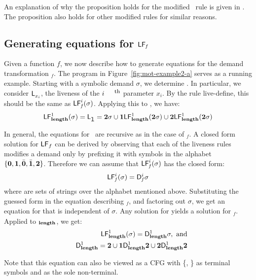 \documentclass[9pt]{sigplanconf}
\begin{document}
An  explanation of  why the  proposition holds  for the
modified  \CONS\ rule  is  given in  \cite{asati14lgc}.
The proposition also holds for other modified rules for
similar reasons.


\subsection{Generating equations for $\mathsf{LF}_{\mathit f}$}
Given a  function $\mathit{f}$, we now  describe how to
generate  equations   for  the   demand  transformation
\Lfonly$_\mathit{f}$.        The       program       in
Figure~\ref{fig:mot-example2-a}   serves  as   a  running
example.  Starting with a  symbolic demand $\sigma$, we
determine  .   In
particular, we  consider $\mathsf{L}_{{x_i}}^{}$,  the liveness
of the $i^{\mbox{\footnotesize th}}$ parameter $x_i$.   By   the   rule   {\sc
  live-define},   this   should    be   the   same   as
$\mathsf{LF}_{\mathit f}^{i}( {\mathit \sigma})$. Applying this to \length, we have:
$$
 \mathsf{LF}_{\mathit {\mathbf{length}}}^{1}( {\mathit \sigma}) = \mathsf{L}_{{\mbox{\tt l}}}^{} = {\mathbf{2}}\sigma \cup \mathbf{1}\mathsf{LF}_{\mathit {\mathbf{length}}}^{1}( {\mathit {{\mathbf{2}}}\sigma})
  \cup {\mathbf{2}}\mathsf{LF}_{\mathit {\mathbf{length}}}^{1}( {\mathit {{\mathbf{2}}}\sigma})
$$

In general, the equations for \Lfonly\ are recursive as in the case of
\Lfonly$_\mathit{f}$. A closed  form solution for $\mathsf{LF}_{\mathit \mathit{f}}$
can be derived by observing that each of the liveness rules modifies a
demand  only by  prefixing it  with symbols  in the  alphabet $\lbrace
\mathbf{0}, \mathbf{1},\bar{\mathbf{0}},  \bar{\mathbf{1}}, {\mathbf{2}}  \rbrace$. Therefore we  can assume
that $\mathsf{LF}_{\mathit f}^{i}( {\mathit \sigma})$ has the closed form:
\begin{eqnarray}
\label{eq:LF:DI}
  \mathsf{LF}_{\mathit f}^{i}( {\mathit \sigma}) = \mathsf{D}_{\mathit f}^{i}\sigma
\end{eqnarray}
where   are sets of strings  over the alphabet
mentioned above.  Substituting the  guessed form in the
equation   describing    \Lfonly$_{\mathit   f}$,   and
factoring  out   $\sigma$,  we  get  an   equation  for
  that   is  independent  of   $\sigma$.   Any
solution   for      yields  a   solution   for
\Lfonly$_{\mathit  f}$.   Applied to  \Lfonly$_{\mathit
  {\mathbf{length}}}$, we get:
  \begin{eqnarray*}
&&  \mathsf{LF}_{\mathit {\mathbf{length}} }^{1}( {\mathit \sigma}) = \mathsf{D}_{\mathit {\mathbf{length}}}^{1}\sigma,~\mbox{and}\\
&&   \mathsf{D}_{\mathit {\mathbf{length}}}^{1} = {\mathbf{2}} \cup \mathbf{1}\mathsf{D}_{\mathit {\mathbf{length}}}^{1}{\mathbf{2}}
       \cup {\mathbf{2}}\mathsf{D}_{\mathit {\mathbf{length}}}^{1}{{\mathbf{2}}}
  \end{eqnarray*}

Note that this equation can also be viewed as a CFG with \{\acdr,
\clazy\} as terminal symbols and  as the sole
non-terminal.
\end{document}
